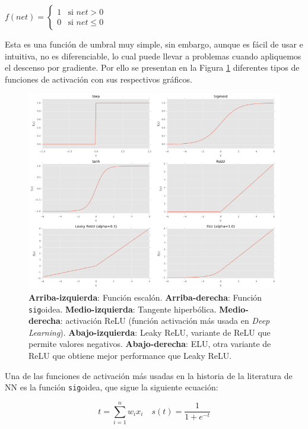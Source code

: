 \documentclass[a4paper,12pt]{article}
\begin{document}
$
f(net) =
\left\{
	\begin{array}{ll}
		1  	& \mbox{si } net > 0 \\
		0 	& \mbox{si } net \leq 0
	\end{array}
\right.
$

Esta es una función de umbral muy simple, sin embargo, aunque es fácil de usar e intuitiva, no es diferenciable, lo cual puede llevar a problemas cuando apliquemos el descenso por gradiente.
Por ello se presentan en la Figura \ref{fig:typesfactivation} diferentes tipos de funciones de activación con sus respectivos gráficos.

\begin{figure}[H]
	\begin{center}				
	\includegraphics[width=1\textwidth]{021.png}
  	\caption{\textbf{Arriba-izquierda}: Función escalón. \textbf{Arriba-derecha}: Función \texttt{sig}oidea. \textbf{Medio-izquierda}: Tangente hiperbólica. \textbf{Medio-derecha}: activación ReLU (función activación más usada en \textit{Deep Learning}).
 \textbf{Abajo-izquierda}: Leaky ReLU, variante de ReLU que permite valores negativos. \textbf{Abajo-derecha}:
ELU, otra variante de ReLU que obtiene mejor performance que Leaky ReLU.}
  	\label{fig:typesfactivation}
  	\end{center}
\end{figure}

Una de las funciones de activación más usadas en la historia de la literatura de NN es la función \texttt{sig}oidea, que sigue la siguiente ecuación:

\begin{equation}
t=\sum_{i=1}^{n}w_ix_i \quad s(t)=\frac{1}{1+e^{-t}}
\end{equation}
\end{document}
